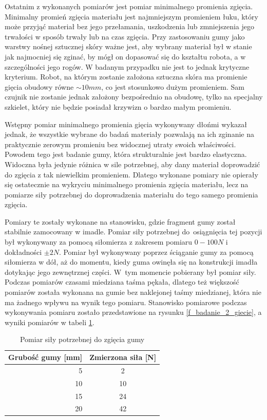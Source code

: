 Ostatnim z wykonanych pomiarów jest pomiar minimalnego promienia zgięcia. Minimalny promień zgięcia materiału jest najmniejszym promieniem łuku, który może przyjąć materiał bez jego przełamania, uszkodzenia lub zmniejszenia jego trwałości w sposób trwały lub na czas zgięcia. Przy zastosowaniu gumy jako warstwy nośnej sztucznej skóry ważne jest, aby wybrany materiał był w stanie jak najmocniej się zginać, by mógł on dopasować się do kształtu robota, a w szczególności jego rogów. W badanym przypadku nie jest to jednak krytyczne kryterium. Robot, na którym zostanie założona sztuczna skóra ma promienie gięcia obudowy równe $\sim 10mm$, co jest stosunkowo dużym promieniem. Sam czujnik nie zostanie jednak założony bezpośrednio na obudowę, tylko na specjalny szkielet, który nie będzie posiadał krzywizn o bardzo małym promieniu.

Wstępny pomiar minimalnego promienia gięcia wykonywany dłońmi wykazał jednak, że wszystkie wybrane do badań materiały pozwalają na ich zginanie na praktycznie zerowym promieniu bez widocznej utraty swoich właściwości. Powodem tego jest badanie gumy, która strukturalnie jest bardzo elastyczna.
Widoczna była jedynie różnica w sile potrzebnej, aby dany materiał doprowadzić do zgięcia z tak niewielkim promieniem. Dlatego wykonane pomiary nie opierały się ostatecznie na wykryciu minimalnego promienia zgięcia materiału, lecz na pomiarze siły potrzebnej do doprowadzenia materiału do tego samego promienia zgięcia.

Pomiary te zostały wykonane na stanowisku, gdzie fragment gumy został stabilnie zamocowany w imadle.
Pomiar siły potrzebnej do~osiągnięcia tej pozycji był wykonywany za pomocą siłomierza z zakresem pomiaru $0-100 N$ i dokładności $\pm 2 N$. 
Pomiar był wykonywany poprzez ściąganie gumy za pomocą siłomierza w dół, aż do momentu, kiedy guma owinęła się na konstrukcji imadła dotykając jego zewnętrznej części. W~tym momencie pobierany był pomiar siły.
Podczas pomiarów czasami miedziana taśma pękała, dlatego też większość pomiarów została wykonana na gumie bez naklejonej taśmy miedzianej, która nie ma żadnego wpływu na wynik tego pomiaru.
Stanowisko pomiarowe podczas wykonywania pomiaru zostało przedstawione na rysunku \ref{f_badanie_2_giecie}, a wyniki pomiarów w tabeli \ref{t_badanie_2_giecie}. 

\begin{table}[!h]
\centering
\caption{Pomiar siły potrzebnej do zgięcia gumy}
\begin{tabular}{r|c}
Grubość gumy {[}mm{]} & Zmierzona siła {[}N{]} \\
\hline
\hline
5                     & 2                      \\
\hline
10                    & 10                     \\
\hline
15                    & 24                     \\
\hline
20                    & 42                    
\end{tabular}
\label{t_badanie_2_giecie}
\end{table}

